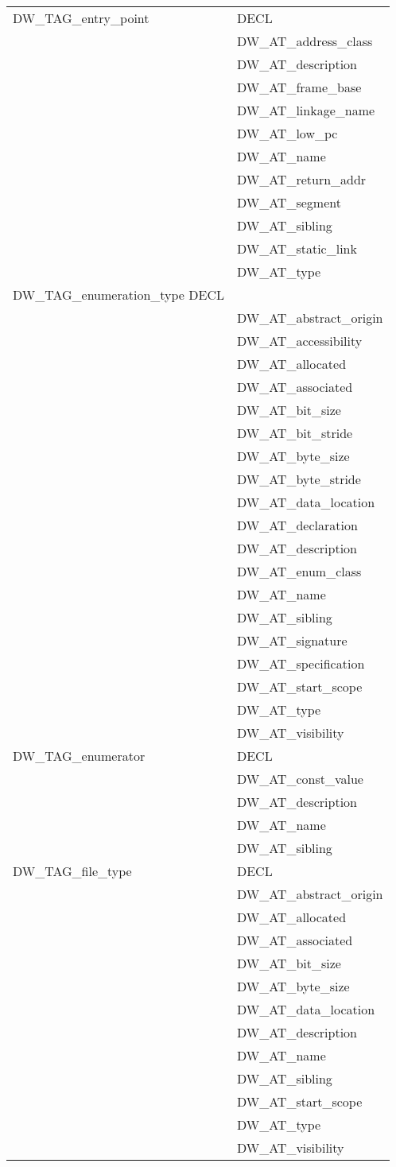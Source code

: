 \begin{longtable}{l|p{8cm}}
DW\_TAG\_entry\_point
&DECL \\
&DW\_AT\_address\_class \\
&DW\_AT\_description \\
&DW\_AT\_frame\_base \\
&DW\_AT\_linkage\_name \\
&DW\_AT\_low\_pc \\
&DW\_AT\_name \\
&DW\_AT\_return\_addr \\
&DW\_AT\_segment \\
&DW\_AT\_sibling \\
&DW\_AT\_static\_link \\
&DW\_AT\_type \\


DW\_TAG\_enumeration\_type
DECL \\
&DW\_AT\_abstract\_origin \\
&DW\_AT\_accessibility \\
&DW\_AT\_allocated \\
&DW\_AT\_associated \\
&DW\_AT\_bit\_size \\
&DW\_AT\_bit\_stride \\
&DW\_AT\_byte\_size \\
&DW\_AT\_byte\_stride \\
&DW\_AT\_data\_location \\
&DW\_AT\_declaration \\
&DW\_AT\_description \\
&DW\_AT\_enum\_class \\
&DW\_AT\_name \\
&DW\_AT\_sibling \\
&DW\_AT\_signature \\
&DW\_AT\_specification \\
&DW\_AT\_start\_scope \\
&DW\_AT\_type \\
&DW\_AT\_visibility \\

DW\_TAG\_enumerator
&DECL \\
&DW\_AT\_const\_value \\
&DW\_AT\_description \\
&DW\_AT\_name \\
&DW\_AT\_sibling \\

DW\_TAG\_file\_type
&DECL \\
&DW\_AT\_abstract\_origin \\
&DW\_AT\_allocated \\
&DW\_AT\_associated \\
&DW\_AT\_bit\_size \\
&DW\_AT\_byte\_size \\
&DW\_AT\_data\_location \\
&DW\_AT\_description \\
&DW\_AT\_name \\
&DW\_AT\_sibling \\
&DW\_AT\_start\_scope \\
&DW\_AT\_type \\
&DW\_AT\_visibility \\


\end{longtable}
